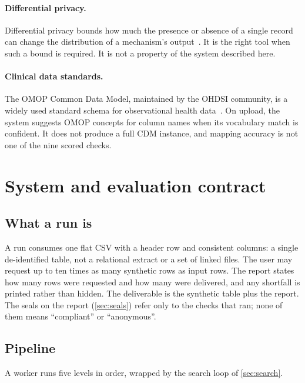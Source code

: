 \documentclass[11pt,a4paper]{article}
\begin{document}
\paragraph{Differential privacy.}
Differential privacy bounds how much the presence or absence of a single record can change the distribution of a mechanism's output~\cite{dwork2006}. It is the right tool when such a bound is required. It is not a property of the system described here.

\paragraph{Clinical data standards.}
The OMOP Common Data Model, maintained by the OHDSI community, is a widely used standard schema for observational health data~\cite{hripcsak2015}. On upload, the system suggests OMOP concepts for column names when its vocabulary match is confident. It does not produce a full CDM instance, and mapping accuracy is not one of the nine scored checks.

\section{System and evaluation contract}\label{sec:method}

\subsection{What a run is}

A run consumes one flat CSV with a header row and consistent columns: a single de-identified table, not a relational extract or a set of linked files. The user may request up to ten times as many synthetic rows as input rows. The report states how many rows were requested and how many were delivered, and any shortfall is printed rather than hidden. The deliverable is the synthetic table plus the report. The seals on the report (\cref{sec:seals}) refer only to the checks that ran; none of them means ``compliant'' or ``anonymous''.

\subsection{Pipeline}\label{sec:pipeline}

A worker runs five levels in order, wrapped by the search loop of \cref{sec:search}.
\end{document}
